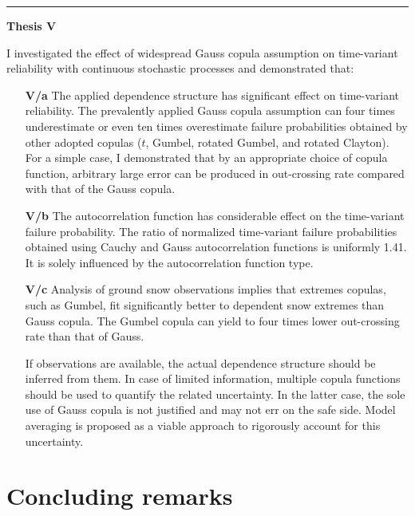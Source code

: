 \begin{center}
	\noindent\rule[0.5ex]{0.5\linewidth}{0.5pt}
	\item[\textbf{Thesis V}] \hfill
\end{center}
I investigated the effect of widespread Gauss copula assumption on time-variant reliability with continuous stochastic processes and demonstrated that:
\begin{enumerate}[leftmargin=*, align=left, labelwidth=*]
  \item[\textbf{V/a}] The applied dependence structure has significant effect on time-variant reliability. The prevalently applied Gauss copula assumption can four times underestimate or even ten times overestimate failure probabilities obtained by other adopted copulas ($t$, Gumbel, rotated Gumbel, and rotated Clayton). For a simple case, I demonstrated that by an appropriate choice of copula function, arbitrary large error can be produced in out-crossing rate compared with that of the Gauss copula.
  
  \item[\textbf{V/b}] The autocorrelation function has considerable effect on the time-variant failure probability. The ratio of normalized time-variant failure probabilities obtained using Cauchy and Gauss autocorrelation functions is uniformly 1.41. It is solely influenced by the autocorrelation function type.
  
  \item[\textbf{V/c}] Analysis of ground snow observations implies that extremes copulas, such as Gumbel, fit significantly better to dependent snow extremes than Gauss copula. The Gumbel copula can yield to four times lower out-crossing rate than that of Gauss.
  
  If observations are available, the actual dependence structure should be inferred from them. In case of limited information, multiple copula functions should be used to quantify the related uncertainty. In the latter case, the sole use of Gauss copula is not justified and may not err on the safe side. Model averaging is proposed as a viable approach to rigorously account for this uncertainty.
\end{enumerate}

\citep{RozsasSR2016}

\section{Concluding remarks}

